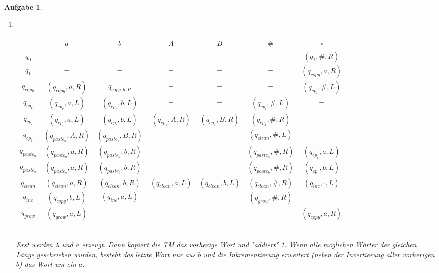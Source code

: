 \documentclass[11pt]{article}
\theoremstyle{break}
\newtheorem{task}{Aufgabe}
\begin{document}
\begin{task}
    \hfill\vspace{-5mm}
    \begin{enumerate}[label={(\alph*)}]
        \item \hfill\vspace{-5mm}\\\begin{tabular}{c|c|c|c|c|c|c}
            &$a$&$b$&$A$&$B$&$\#$&$\square$\\\hline
            $q_0$&$-$&$-$&$-$&$-$&$-$&$(q_1,\#,R)$\\\hline
            $q_1$&$-$&$-$&$-$&$-$&$-$&$(q_{copy},a,R)$\\\hline
            $q_{copy}$&$(q_{copy},a,R)$&$q_{copy,b,R}$&$-$&$-$&$-$&$(q_{cp_l},\#,L)$\\\hline
            $q_{cp_{r}}$&$(q_{cp_{r}},a,L)$&$(q_{cp_{r}},b,L)$&$-$&$-$&$(q_{cp_l},\#,L)$&$-$\\\hline
            $q_{cp_l}$&$(q_{cp_l},a,L)$&$(q_{cp_l},b,L)$&$(q_{cp_1},A,R)$&$(q_{cp_1},B,R)$&$(q_{cp_1},\#,R)$&$-$\\\hline
            $q_{cp_1}$&$(q_{paste_a},A,R)$&$(q_{paste_b},B,R)$&$-$&$-$&$(q_{clean},\#,L)$&$-$\\\hline
            $q_{paste_a}$&$(q_{paste_a},a,R)$&$(q_{paste_a},b,R)$&$-$&$-$&$(q_{paste_a},\#,R)$&$(q_{cp_{r}},a,L)$\\\hline
            $q_{paste_b}$&$(q_{paste_b},a,R)$&$(q_{paste_b},b,R)$&$-$&$-$&$(q_{paste_b},\#,R)$&$(q_{cp_{r}},b,L)$\\\hline
            $q_{clean}$&$(q_{clean},a,R)$&$(q_{clean},b,R)$&$(q_{clean},a,L)$&$(q_{clean},b,L)$&$(q_{clean},\#,R)$&$(q_{inc},\square,L)$\\\hline
            $q_{inc}$&$(q_{copy},b,L)$&$(q_{inc},a,L)$&$-$&$-$&$(q_{grow},\#,R)$&$-$\\\hline
            $q_{grow}$&$(q_{grow},a,L)$&$-$&$-$&$-$&$-$&$(q_{copy},a,R)$
        \end{tabular}\vspace{3mm}\\
        Erst werden $\lambda$ und $a$ erzeugt. Dann kopiert die TM das vorherige Wort und "addiert" 1. Wenn alle möglichen Wörter der gleichen Länge geschrieben wurden, besteht das letzte Wort nur aus $b$ und die Inkrementierung erweitert (neben der Invertierung aller vorherigen $b$) das Wort um ein $a$.
    \end{enumerate}
\end{task}
\end{document}

